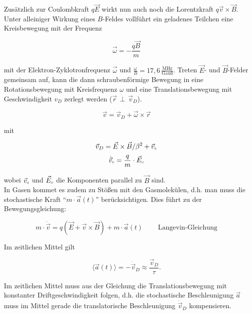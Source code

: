 Zusätzlich zur Coulombkraft $q\vec{E}$ wirkt nun auch noch die Lorentzkraft $q\vec{v}\times
\vec{B}$. Unter alleiniger Wirkung eines $B$-Feldes vollführt ein geladenes Teilchen eine
Kreisbewegung mit der Frequenz

\[\vec{\omega} = -\frac{q\vec{B}}{m}\]

mit der Elektron-Zyklotronfrequenz $\vec{\omega}$ und
$\frac{\omega}{B}=17{,}6\,\frac{\text{MHz}}{\text{Gauß}}$. Treten $\vec{E}$- und $\vec{B}$-Felder
gemeinsam auf, kann die dann schraubenförmige Bewegung in eine Rotationsbewegung mit Kreisfrequenz
$\omega$ und eine Translationsbewegung mit Geschwindigkeit $v_D$ zerlegt werden
($\vec{r}\,\perp\,\vec{v}_D$). 

\begin{figure}[H]
		\centering
		
\end{figure}

\[ \vec{v}= \vec{v}_D + \vec{\omega}\times\vec{r} \]
 
 mit
 
 \[\vec{v}_D=\vec{E}\times \vec{B}/\beta^2 +\vec{v}_\shortparallel  \]
 \[\dot{\vec{v}}_\shortparallel = \frac{q}{m} \cdot\vec{E}_\shortparallel\]
 
 wobei $\vec{v}_\shortparallel$ und $\vec{E}_\shortparallel$ die Komponenten parallel zu $\vec{B}$
 sind.
 \\
 In Gasen kommet es zudem zu Stößen mit den Gasmolekülen, d.h. man muss die stochastische Kraft
 "`$m\cdot\vec{a}(t)$"' berücksichtigen. Dies führt zu der Bewegungsgleichung:
 
 \[m\cdot \dot{\vec{v}} = q\left( \vec{E}+\vec{v}\times\vec{B} \right) +m\cdot
 \vec{a}(t)~~~~~~~~~~\text{Langevin-Gleichung} \]

 Im zeitlichen Mittel gilt
 
 \[\langle \vec{a}(t) \rangle = - \dot{\vec{v}}_D  \approx \frac{\vec{v}_D}{\tau}. \]
 
 Im zeitlichen Mittel muss aus der Gleichung die Translationsbewegung mit konstanter
 Driftgeschwindigkeit folgen, d.h. die stochastische Beschleunigung $\vec{a}$ muss im Mittel gerade
 die translatorische Beschleunigung $\dot{\vec{v}}_D$ kompensieren.
